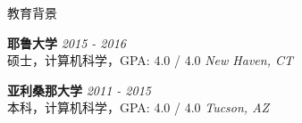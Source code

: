 \documentclass[
	a4paper,  %
	11pt,  %
]{resume}  %
\begin{document}

\begin{rSection}{教育背景}
	
	\textbf{耶鲁大学} \hfill \textit{2015 - 2016} \\ 
	{\kaishu 硕士，计算机科学，GPA: 4.0 / 4.0 } \hfill \textit{New Haven, CT}

	\textbf{亚利桑那大学} \hfill \textit{2011 - 2015} \\ 
	{\kaishu 本科，计算机科学，GPA: 4.0 / 4.0 } \hfill \textit{Tucson, AZ}
	
\end{rSection}

\end{document}
